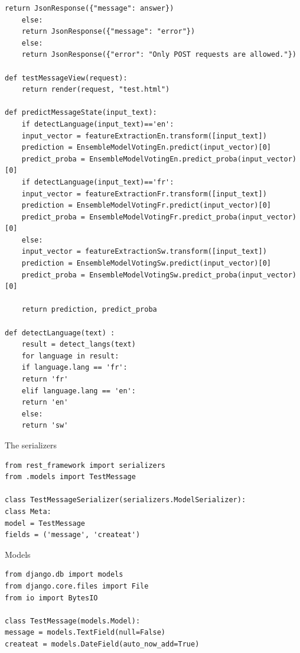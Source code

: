 \documentclass[12pt,a4paper, oneside]{book}
\begin{document}
\begin{lstlisting}[style=stylejupyter]
	return JsonResponse({"message": answer})
	else:
	return JsonResponse({"message": "error"})
	else:
	return JsonResponse({"error": "Only POST requests are allowed."})

def testMessageView(request):
	return render(request, "test.html")

def predictMessageState(input_text):
	if detectLanguage(input_text)=='en':
	input_vector = featureExtractionEn.transform([input_text])
	prediction = EnsembleModelVotingEn.predict(input_vector)[0]
	predict_proba = EnsembleModelVotingEn.predict_proba(input_vector)[0]
	if detectLanguage(input_text)=='fr':
	input_vector = featureExtractionFr.transform([input_text])
	prediction = EnsembleModelVotingFr.predict(input_vector)[0]
	predict_proba = EnsembleModelVotingFr.predict_proba(input_vector)[0]
	else:
	input_vector = featureExtractionSw.transform([input_text])
	prediction = EnsembleModelVotingSw.predict(input_vector)[0]
	predict_proba = EnsembleModelVotingSw.predict_proba(input_vector)[0] 
	
	return prediction, predict_proba

def detectLanguage(text) :
	result = detect_langs(text)
	for language in result:
	if language.lang == 'fr':
	return 'fr'
	elif language.lang == 'en':
	return 'en'
	else:
	return 'sw'
\end{lstlisting}
The serializers
\begin{lstlisting}[style=stylejupyter]
from rest_framework import serializers
from .models import TestMessage

class TestMessageSerializer(serializers.ModelSerializer):
class Meta:
model = TestMessage
fields = ('message', 'createat')  
\end{lstlisting}
Models
\begin{lstlisting}[style=stylejupyter] 
from django.db import models
from django.core.files import File
from io import BytesIO

class TestMessage(models.Model):
message = models.TextField(null=False)
createat = models.DateField(auto_now_add=True)

\end{lstlisting}
\backmatter
\appendix	
	
\end{document}
